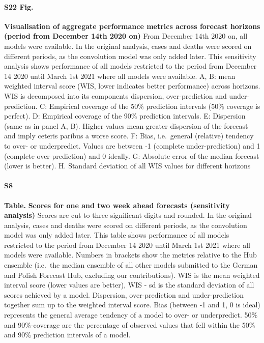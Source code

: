 \documentclass[10pt,letterpaper]{article}
\begin{document}
\paragraph{S22 Fig.}
\label{fig:agg-performance-all-late}

\textbf{Visualisation of aggregate performance metrics across forecast horizons (period from December 14th 2020 on)}
From December 14th 2020 on, all models were available. In the original
analysis, cases and deaths were scored on different periods, as the
convolution model was only added later. This sensitivity analysis shows
performance of all models restricted to the period from December 14 2020
until March 1st 2021 where all models were available. A, B: mean
weighted interval score (WIS, lower indicates better performance) across
horizons. WIS is decomposed into its components dispersion,
over-prediction and under-prediction. C: Empirical coverage of the 50\%
prediction intervals (50\% coverage is perfect). D: Empirical coverage
of the 90\% prediction intervals. E: Dispersion (same as in panel A, B).
Higher values mean greater dispersion of the forecast and imply ceteris
paribus a worse score. F: Bias, i.e.~general (relative) tendency to
over- or underpredict. Values are between -1 (complete under-prediction)
and 1 (complete over-prediction) and 0 ideally. G: Absolute error of the
median forecast (lower is better). H. Standard deviation of all WIS
values for different horizons

\paragraph{S8}

\textbf{Table.} \label{tab:score-table-late-2}
\textbf{Scores for one and two week ahead forecasts (sensitivity analysis)}
Scores are cut to three significant digits and rounded. In the original
analysis, cases and deaths were scored on different periods, as the
convolution model was only added later. This table shows performance of
all models restricted to the period from December 14 2020 until March
1st 2021 where all models were available. Numbers in brackets show the
metrics relative to the Hub ensemble (i.e.~the median ensemble of all
other models submitted to the German and Polish Forecast Hub, excluding
our contributions). WIS is the mean weighted interval score (lower
values are better), WIS - sd is the standard deviation of all scores
achieved by a model. Dispersion, over-prediction and under-prediction
together sum up to the weighted interval score. Bias (between -1 and 1,
0 is ideal) represents the general average tendency of a model to over-
or underpredict. 50\% and 90\%-coverage are the percentage of observed
values that fell within the 50\% and 90\% prediction intervals of a
model.
\end{document}
